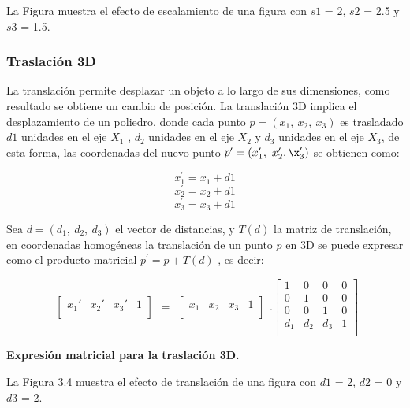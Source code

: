 La Figura muestra el efecto de escalamiento de una figura con $s1$ = 2, $s2$ = 2.5 y $s3$ = 1.5.

\subsubsection{Traslación 3D}
La translación permite desplazar un objeto a lo largo de sus dimensiones, como resultado se obtiene un cambio de posición. La translación 3D implica el desplazamiento de un poliedro, donde cada punto $p = (x_{1},\ x_{2},\ x_{3})$ es trasladado $d1$ unidades en el eje $X_1$ , $d_2$ unidades en el eje $X_2$ y $d_3$ unidades en el eje $X_3$, de esta forma, las coordenadas del nuevo punto
$p^{\prime} = (x_{1}^{\prime},\ x_{2}^{\prime},\x_{3}^{\prime})$ se obtienen como:

$$x_{1}^{\prime} = x_{1} + d1$$
$$x_{2}^{\prime} = x_{2} + d1$$
$$x_{3}^{\prime} = x_{3} + d1$$

Sea $d = (d_{1},\ d_{2},\ d_{3})$ el vector de distancias, y $T(d)$ la matriz de translación, en
coordenadas homogéneas la translación de un punto $p$ en 3D se puede expresar como el producto matricial $p^{\prime} = p + T(d)$ , es decir:

$$
\begin{array}{rccl}
\left[
\begin{array}{rccl}
x_{1}{\prime} & x_{2}{\prime} & x_{3}{\prime} & 1\\
\end{array}
\right]
\end{array}
=
\begin{array}{rccl}
\left[
\begin{array}{rccl}
x_{1} & x_{2} & x_{3} & 1\\
\end{array}
\right]
\end{array} 
.
\left[
\begin{array}{rccl}
1 & 0 & 0 & 0\\
0 & 1 & 0 & 0\\
0 & 0 & 1 & 0\\
d_{1} & d_{2} & d_{3} & 1\\
\end{array}
\right]
$$

\begin{center}
\textbf{\footnotesize{Expresión matricial para la traslación 3D.}}
\end{center}

La Figura 3.4 muestra el efecto de translación de una figura con $d1$ = 2, $d2$ = 0 y $d3$ = 2.

